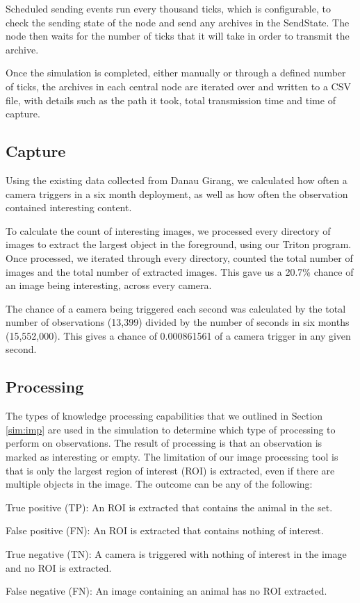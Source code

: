 	Scheduled sending events run every thousand ticks, which is configurable, to check the sending state of the node and send any archives in the SendState. The node then waits for the number of ticks that it will take in order to transmit the archive.
	
	Once the simulation is completed, either manually or through a defined number of ticks, the archives in each central node are iterated over and written to a CSV file, with details such as the path it took, total transmission time and time of capture.
	
\subsection{Capture}
	Using the existing data collected from Danau Girang, we calculated how often a camera triggers in a six month deployment, as well as how often the observation contained interesting content. 
	
	To calculate the count of interesting images, we processed every directory of images to extract the largest object in the foreground, using our Triton program. Once processed, we iterated through every directory, counted the total number of images and the total number of extracted images. This gave us a 20.7\% chance of an image being interesting, across every camera.
	
	The chance of a camera being triggered each second was calculated by the total number of observations (13,399) divided by the number of seconds in six months (15,552,000). This gives a chance of 0.000861561 of a camera trigger in any given second.
	
\subsection{Processing}
	The types of knowledge processing capabilities that we outlined in Section \ref{sim:imp} are used in the simulation to determine which type of processing to perform on observations. The result of processing is that an observation is marked as interesting or empty. The limitation of our image processing tool is that is only the largest region of interest (ROI) is extracted, even if there are multiple objects in the image. The outcome can be any of the following:
		\begin{description}
			\item True positive (TP): An ROI is extracted that contains the animal in the set.
			\item False positive (FN): An ROI is extracted that contains nothing of interest.
			\item True negative (TN): A camera is triggered with nothing of interest in the image and no ROI is extracted.
			\item False negative (FN): An image containing an animal has no ROI extracted.
		\end{description}
	
